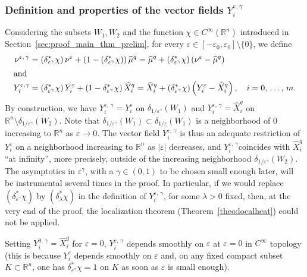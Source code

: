 \documentclass[10pt]{amsart}
\theoremstyle{definition}\newtheorem{defi}[theo]{Definition}\newtheorem{rema}[theo]{Remark}\newtheorem{exam}[theo]{Example}\newtheorem{exem}[theo]{Example}\newtheorem{nota}[theo]{Notation}
\newcommand*\R{\mathbb{R}}
\begin{document}
\subsubsection{Definition and properties of the vector fields \texorpdfstring{$Y_i^{\varepsilon,\gamma}$}{Yi varepsilon, gamma}}\label{sec_defYiepsgam}
Considering the subsets $W_1,W_2$ and the function $\chi\in C^\infty(\R^n)$ introduced in Section~\ref{sec:proof_main_thm_prelim}, for every $\varepsilon\in[-\varepsilon_0,\varepsilon_0]\setminus\{0\}$, we define
\begin{align*}
\nu^{\varepsilon,\,\gamma} &= \left(\delta_{\varepsilon^\gamma}^*\chi\right) \nu^\varepsilon + \left(1-\left(\delta_{\varepsilon^\gamma}^*\chi\right)\right)\widehat{\mu}^{q} = \widehat{\mu}^{q} + \left(\delta_{\varepsilon^\gamma}^*\chi\right) \left(\nu^\varepsilon - \widehat{\mu}^{q}\right)
\\
\intertext{and}
Y_i^{\varepsilon,\gamma} &= \left(\delta_{\varepsilon^\gamma}^*\chi\right) Y_i^\varepsilon + \left(1-\delta_{\varepsilon^\gamma}^*\chi\right)\widehat{X}_i^{q} = \widehat{X}_i^{q} + \left(\delta_{\varepsilon^\gamma}^*\chi\right) \left(Y_i^\varepsilon-\widehat{X}_i^{q}\right), \quad i=0,\,\ldots,\,m.
\end{align*}
By construction, we have $Y_i^{\varepsilon,\,\gamma} = Y_i^\varepsilon$ on $\delta_{1/\varepsilon^\gamma}(W_1)$ and $Y_i^{\varepsilon,\,\gamma} = \widehat{X}_i^{q}$ on $\R^n\setminus\delta_{1/\varepsilon^\gamma}(W_2)$. Note that $\delta_{1/\varepsilon^\gamma}(W_1)\subset \delta_{1/\varepsilon}(W_1)$ is a neighborhood of $0$ increasing to $\R^n$ as $\varepsilon\rightarrow 0$. The vector field $Y_i^{\varepsilon,\,\gamma}$ is thus an adequate restriction of $Y_i^\varepsilon$ on a neighborhood increasing to $\R^n$ as $\vert\varepsilon\vert$ decreases, and $Y_i^{\varepsilon,\,\gamma}$coincides with $\widehat{X}_i^{q}$ ``at infinity'', more precisely, outside of the increasing neighborhood $\delta_{1/\varepsilon^\gamma}(W_2)$. The asymptotics in $\varepsilon^\gamma$, with a $\gamma\in(0,1)$ to be chosen small enough later, will be instrumental several times in the proof. In particular, if we would replace $(\delta_{\varepsilon^\gamma}^*\chi)$ by $(\delta_\lambda^*\chi)$ in the definition of $Y_i^{\varepsilon,\,\gamma}$, for some $\lambda>0$ fixed, then, at the very end of the proof, the localization theorem (Theorem~\ref{theo:localheat}) could not be applied.

Setting $Y_i^{0,\,\gamma}= \widehat{X}_i^{q}$ for $\varepsilon=0$, $Y_i^{\varepsilon,\,\gamma}$ depends smoothly on $\varepsilon$ at $\varepsilon=0$ in $C^\infty$ topology (this is because $Y_i^\varepsilon$ depends smoothly on $\varepsilon$ and, on any fixed compact subset $K\subset\R^n$, one has $\delta_{\varepsilon^\gamma}^*\chi=1$ on $K$ as soon as $\varepsilon$ is small enough).
\end{document}
